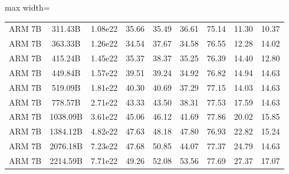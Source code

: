 \documentclass{article}
\begin{document}
\begin{table}[t!]
\begin{adjustbox}{max width=\textwidth}
\begin{tabular}{ccc|cccccc}
    ARM 7B & 311.43B & 1.08e22 & 35.66 & 35.49 & 36.61 & 75.14 & 11.30 & 10.37 \\
    ARM 7B & 363.33B & 1.26e22 & 34.54 & 37.67 & 34.58 & 76.55 & 12.28 & 14.02 \\
    ARM 7B & 415.24B & 1.45e22 & 35.37 & 38.37 & 35.25 & 76.39 & 14.40 & 12.80 \\
    ARM 7B & 449.84B & 1.57e22 & 39.51 & 39.24 & 34.92 & 76.82 & 14.94 & 14.63 \\
    ARM 7B & 519.09B & 1.81e22 & 40.30 & 40.69 & 37.29 & 77.15 & 14.03 & 14.63 \\
    ARM 7B & 778.57B & 2.71e22 & 43.33 & 43.50 & 38.31 & 77.53 & 17.59 & 14.63 \\
    ARM 7B & 1038.09B & 3.61e22 & 45.06 & 46.12 & 41.69 & 77.86 & 20.02 & 15.85 \\
    ARM 7B & 1384.12B & 4.82e22 & 47.63 & 48.18 & 47.80 & 76.93 & 22.82 & 15.24 \\
    ARM 7B & 2076.18B & 7.23e22 & 47.68 & 50.85 & 44.07 & 77.37 & 24.79 & 14.63 \\
    ARM 7B & 2214.59B & 7.71e22 & 49.26 & 52.08 & 53.56 & 77.69 & 27.37 & 17.07 \\
    \bottomrule     
    \end{tabular}
    \end{adjustbox}
    \vspace{-.2cm}
\end{table}
\end{document}
